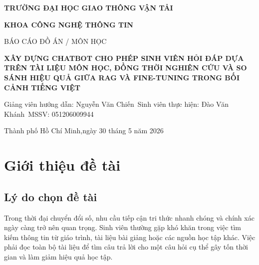 \documentclass[12pt,a4paper]{report}
\begin{document}
	
	
	\begin{titlepage}
		\begin{center}
			
			\textbf{\Large TRƯỜNG ĐẠI HỌC GIAO THÔNG VẬN TẢI}
			
			\vspace{1cm}
			
			\textbf{\Large KHOA CÔNG NGHỆ THÔNG TIN}
			
			\vspace{2cm}
			
			{\Large BÁO CÁO ĐỒ ÁN / MÔN HỌC}
			
			\vspace{2cm}
			
			{\Huge \textbf{XÂY DỰNG CHATBOT CHO PHÉP SINH VIÊN HỎI ĐÁP DỰA TRÊN TÀI LIỆU MÔN HỌC, ĐỒNG THỜI NGHIÊN CỨU VÀ SO SÁNH HIỆU QUẢ GIỮA RAG VÀ FINE-TUNING TRONG BỐI CẢNH TIẾNG VIỆT}}
			
			\vfill
			
			\begin{flushleft}
				Giảng viên hướng dẫn: Nguyễn Văn Chiến\
				Sinh viên thực hiện: Đào Văn Khánh\
				MSSV: 051206009944\
				
			\end{flushleft}
			
			\vfill
			
			Thành phố Hồ Chí Minh,ngày 30 tháng 5 năm 2026
			
		\end{center}
	\end{titlepage}
	
	
	\tableofcontents
	\newpage
	
	
	\chapter{Giới thiệu đề tài}
	
	\section{Lý do chọn đề tài}
	
	Trong thời đại chuyển đổi số, nhu cầu tiếp cận tri thức nhanh chóng và chính xác ngày càng trở nên quan trọng. Sinh viên thường gặp khó khăn trong việc tìm kiếm thông tin từ giáo trình, tài liệu bài giảng hoặc các nguồn học tập khác. Việc phải đọc toàn bộ tài liệu để tìm câu trả lời cho một câu hỏi cụ thể gây tốn thời gian và làm giảm hiệu quả học tập.
	
\end{document}
